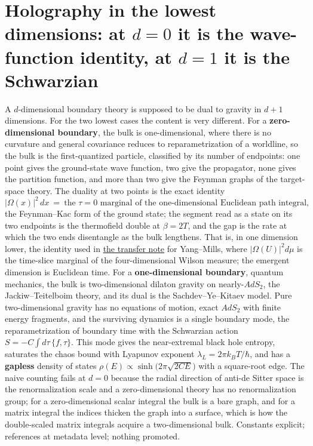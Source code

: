 \documentclass[11pt,a4paper]{article}
\begin{document}
\hypertarget{holography-in-the-lowest-dimensions-at-d0-it-is-the-wave-function-identity-at-d1-it-is-the-schwarzian}{%
\section{\texorpdfstring{Holography in the lowest dimensions: at \(d=0\)
it is the wave-function identity, at \(d=1\) it is the
Schwarzian}{Holography in the lowest dimensions: at d=0 it is the wave-function identity, at d=1 it is the Schwarzian}}\label{holography-in-the-lowest-dimensions-at-d0-it-is-the-wave-function-identity-at-d1-it-is-the-schwarzian}}

A \(d\)-dimensional boundary theory is supposed to be dual to gravity in
\(d+1\) dimensions. For the two lowest cases the content is very
different. For a \textbf{zero-dimensional boundary}, the bulk is
one-dimensional, where there is no curvature and general covariance
reduces to reparametrization of a worldline, so the bulk is the
first-quantized particle, classified by its number of endpoints: one
point gives the ground-state wave function, two give the propagator,
none gives the partition function, and more than two give the Feynman
graphs of the target-space theory. The duality at two points is the
exact identity
\[|\Omega(x)|^2\,dx\ =\ \text{the }\tau=0\text{ marginal of the one-dimensional Euclidean path integral},\]
the Feynman--Kac form of the ground state; the segment read as a state
on its two endpoints is the thermofield double at \(\beta=2T\), and the
gap is the rate at which the two ends disentangle as the bulk lengthens.
That is, in one dimension lower, the identity used in
\href{ground-state-measure-transfer.md}{the transfer note} for
Yang--Mills, where \(|\Omega(U)|^2d\mu\) is the time-slice marginal of
the four-dimensional Wilson measure; the emergent dimension is Euclidean
time. For a \textbf{one-dimensional boundary}, quantum mechanics, the
bulk is two-dimensional dilaton gravity on nearly-\(AdS_2\), the
Jackiw--Teitelboim theory, and its dual is the Sachdev--Ye--Kitaev
model. Pure two-dimensional gravity has no equations of motion, exact
\(AdS_2\) with finite energy fragments, and the surviving dynamics is a
single boundary mode, the reparametrization of boundary time with the
Schwarzian action \(S=-C\int d\tau\,\{f,\tau\}\). This mode gives the
near-extremal black hole entropy, saturates the chaos bound with
Lyapunov exponent \(\lambda_L=2\pi k_BT/\hbar\), and has a
\textbf{gapless} density of states
\(\rho(E)\propto\sinh\big(2\pi\sqrt{2CE}\big)\) with a square-root edge.
The naive counting fails at \(d=0\) because the radial direction of
anti-de Sitter space is the renormalization scale and a zero-dimensional
theory has no renormalization group; for a zero-dimensional scalar
integral the bulk is a bare graph, and for a matrix integral the indices
thicken the graph into a surface, which is how the double-scaled matrix
integrals acquire a two-dimensional bulk. Constants explicit; references
at metadata level; nothing promoted.
\end{document}

